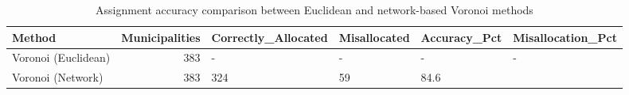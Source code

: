 \begin{table}
\caption{Assignment accuracy comparison between Euclidean and network-based Voronoi methods}
\label{tab:assignment_comparison}
\begin{tabular}{lrllll}
\toprule
Method & Municipalities & Correctly_Allocated & Misallocated & Accuracy_Pct & Misallocation_Pct \\
\midrule
Voronoi (Euclidean) & 383 & - & - & - & - \\
Voronoi (Network) & 383 & 324 & 59 & 84.6%
\bottomrule
\end{tabular}
\end{table}
